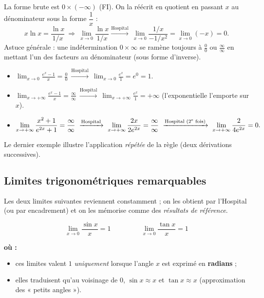 \documentclass[11pt,a4paper]{article}
\newenvironment{ou}{%
  \par\smallskip\noindent\textbf{où :}\nopagebreak
  \begin{itemize}[leftmargin=1.8em,topsep=2pt,itemsep=1.5pt,parsep=0pt]}%
  {\end{itemize}}
\begin{document}
\begin{exemple}
La forme brute est $0\times(-\infty)$ (FI). On la réécrit en quotient en passant $x$ au
dénominateur sous la forme $\dfrac1x$ :
\[ x\ln x=\frac{\ln x}{1/x}\ \Rightarrow\ \lim_{x\to 0}\frac{\ln x}{1/x}
   \xrightarrow{\text{Hospital}}\ \lim_{x\to 0}\frac{1/x}{-1/x^2}=\lim_{x\to 0}(-x)=0. \]
Astuce générale : une indétermination $0\times\infty$ se ramène toujours à $\tfrac00$ ou
$\tfrac{\infty}{\infty}$ en mettant l'un des facteurs au dénominateur (sous forme d'inverse).
\end{exemple}

\begin{exemple}
\begin{itemize}[leftmargin=1.6em,topsep=2pt,itemsep=6pt]
  \item $\displaystyle\lim_{x\to 0}\frac{e^{x}-1}{x}=\frac00\ \xrightarrow{\text{Hospital}}\ \lim_{x\to 0}\frac{e^{x}}{1}=e^{0}=1.$
  \item $\displaystyle\lim_{x\to+\infty}\frac{e^{x}-1}{x}=\frac{\infty}{\infty}\ \xrightarrow{\text{Hospital}}\ \lim_{x\to+\infty}\frac{e^{x}}{1}=+\infty$ (l'exponentielle l'emporte sur $x$).
  \item $\displaystyle\lim_{x\to+\infty}\frac{x^{2}+1}{e^{2x}+1}=\frac{\infty}{\infty}\ \xrightarrow{\text{Hospital}}\ \lim_{x\to+\infty}\frac{2x}{2e^{2x}}=\frac{\infty}{\infty}\ \xrightarrow{\text{Hospital (2\textsuperscript{e} fois)}}\ \lim_{x\to+\infty}\frac{2}{4e^{2x}}=0.$
\end{itemize}
Le dernier exemple illustre l'application \emph{répétée} de la règle (deux dérivations successives).
\end{exemple}

\subsection{Limites trigonométriques remarquables}

Les deux limites suivantes reviennent constamment ; on les obtient par l'Hospital (ou par
encadrement) et on les mémorise comme des \emph{résultats de référence}.

\begin{formule}
\[ \boxed{\ \lim_{x\to 0}\frac{\sin x}{x}=1\ }\qquad\qquad \boxed{\ \lim_{x\to 0}\frac{\tan x}{x}=1\ } \]
\begin{ou}
  \item ces limites valent $1$ \emph{uniquement} lorsque l'angle $x$ est exprimé en \textbf{radians} ;
  \item elles traduisent qu'au voisinage de $0$, $\sin x\approx x$ et $\tan x\approx x$ (approximation des « petits angles »).
\end{ou}
\end{formule}
\end{document}
